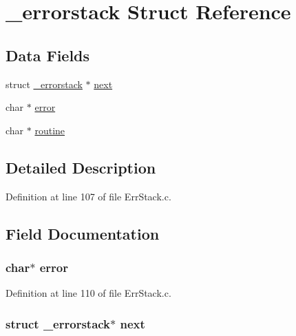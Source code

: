 \hypertarget{struct__errorstack}{\section{\-\_\-errorstack Struct Reference}
\label{struct__errorstack}
}
\subsection*{Data Fields}
\begin{DoxyCompactItemize}
\item 
struct \hyperlink{struct__errorstack}{\-\_\-errorstack} $\ast$ \hyperlink{struct__errorstack_a198388258c3c2d07eb6e21e23da8df51}{next}
\item 
char $\ast$ \hyperlink{struct__errorstack_a37a27b523e8aff433c8a4adda2295f0d}{error}
\item 
char $\ast$ \hyperlink{struct__errorstack_a9c97800f18eafaf3ba425d24e6f3f1ad}{routine}
\end{DoxyCompactItemize}


\subsection{Detailed Description}


Definition at line 107 of file Err\-Stack.\-c.



\subsection{Field Documentation}
\hypertarget{struct__errorstack_a37a27b523e8aff433c8a4adda2295f0d}{
\subsubsection[{error}]{\setlength{\rightskip}{0pt plus 5cm}char$\ast$ error}}\label{struct__errorstack_a37a27b523e8aff433c8a4adda2295f0d}


Definition at line 110 of file Err\-Stack.\-c.

\hypertarget{struct__errorstack_a198388258c3c2d07eb6e21e23da8df51}{
\subsubsection[{next}]{\setlength{\rightskip}{0pt plus 5cm}struct {\bf \-\_\-errorstack}$\ast$ next}}\label{struct__errorstack_a198388258c3c2d07eb6e21e23da8df51}


